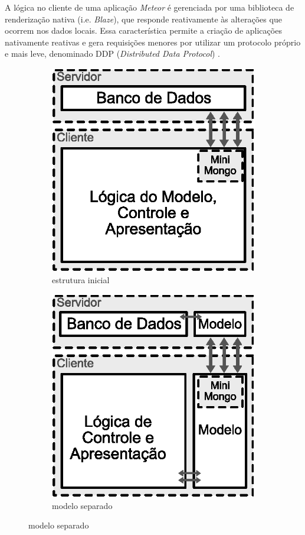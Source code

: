 A lógica no cliente de uma aplicação \textit{Meteor} é gerenciada por uma biblioteca de renderização nativa (i.e. \textit{Blaze}), que responde reativamente às alterações que ocorrem nos dados locais. Essa característica permite a criação de aplicações nativamente reativas e gera requisições menores por utilizar um protocolo próprio e mais leve, denominado DDP (\textit{Distributed Data Protocol}) \cite{blaze2015}. 

\begin{figure}[h!]
	\centering
	\begin{subfigure}{.34\textwidth}
  		\centering
  		\includegraphics[width=.9\linewidth]{figuras/arquitetura1.eps}
  		\caption{estrutura inicial}
  		\label{fig:subarq1}
	\end{subfigure}%
 	 \begin{subfigure}{.34\textwidth}
  		\centering
  		\includegraphics[width=.9\linewidth]{figuras/arquitetura2.eps}
  		\caption{modelo separado}
  		\label{fig:subarq2}
	\end{subfigure}%


\end{figure}
